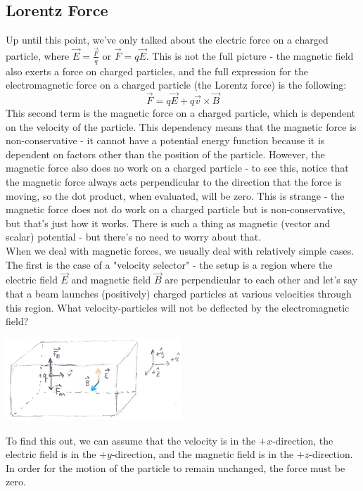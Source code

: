 \subsection{Lorentz Force}
Up until this point, we've only talked about the electric force on a charged particle, where $\vec E = \frac{\vec F}{q}$ or $\vec F = q\vec E$. This is not the full picture - the magnetic field also exerts a force on charged particles, and the full expression for the electromagnetic force on a charged particle (the Lorentz force) is the following:
\[
	\vec F = q\vec E + q\vec v \times \vec B
\]
This second term is the magnetic force on a charged particle, which is dependent on the velocity of the particle. This dependency means that the magnetic force is non-conservative - it cannot have a potential energy function because it is dependent on factors other than the position of the particle. However, the magnetic force also does no work on a charged particle - to see this, notice that the magnetic force always acts perpendicular to the direction that the force is moving, so the dot product, when evaluated, will be zero. This is strange - the magnetic force does not do work on a charged particle but is non-conservative, but that's just how it works. There is such a thing as magnetic (vector and scalar) potential - but there's no need to worry about that.\\
When we deal with magnetic forces, we usually deal with relatively simple cases. The first is the case of a "velocity selector" - the setup is a region where the electric field $\vec E$ and magnetic field $\vec B$ are perpendicular to each other and let's say that a beam launches (positively) charged particles at various velocities through this region. What velocity-particles will not be deflected by the electromagnetic field? \\
\begin{center}
	\includegraphics[width=0.5\textwidth]{images/em/velocity-selector.png}
\end{center}
To find this out, we can assume that the velocity is in the $+x$-direction, the electric field is in the $+y$-direction, and the magnetic field is in the $+z$-direction. In order for the motion of the particle to remain unchanged, the force must be zero. \\
